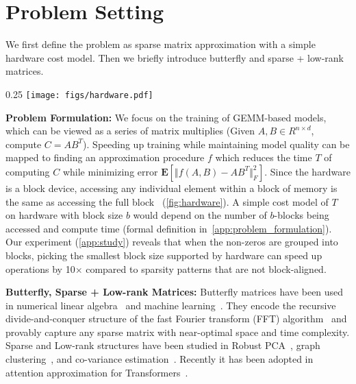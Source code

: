 \section{Problem Setting}
\label{sec:problem_formulation}
We first define the problem as sparse matrix approximation with a simple hardware cost model. Then we briefly introduce butterfly and sparse + low-rank matrices. 

\begin{wrapfigure}{}{0.25\textwidth}
  \captionsetup{font=small}
  \vspace{-2em}
  \centering
  \texttt{[image: figs/hardware.pdf]}
  \vspace{-1em}
  \caption{Visualization of memory access for a hardware with block size 4: accessing the one (red) location means accessing the full $4\times4$ block (blue).}
  \label{fig:hardware}
  \vspace{-1em}
\end{wrapfigure}
\textbf{Problem Formulation:} We focus on the training of GEMM-based models, which can be viewed as a series of matrix multiplies (Given $A, B \in R^{n \times d}$, compute $C = AB^T$). Speeding up training while maintaining model quality can be mapped to finding an approximation procedure $f$ which reduces the time $T$ of computing $C$ while minimizing error $\mathbf{E}[\Vert f(A, B)-AB^T\Vert^2_F]$. Since the hardware is a block device, accessing any individual element within a block of memory is the same as accessing the full block~\citep{cook2012cuda} (\cref{fig:hardware}). A simple cost model of $T$ on hardware with block size $b$ would depend on the number of $b$-blocks being accessed and compute time
(formal definition in~\cref{app:problem_formulation}).
Our experiment (\cref{app:study}) reveals that when the non-zeros are grouped into blocks, picking the smallest block size supported by hardware can speed up operations by 10$\times$ compared to sparsity patterns that are not block-aligned.


\textbf{Butterfly, Sparse + Low-rank Matrices:} Butterfly matrices have been used in numerical linear algebra~\citep{parker1995random, li2015butterfly} and machine learning~\citep{mathieu2014fast, jing2017tunable, munkhoeva2018quadrature, dao2019learning, choromanski2019unifying}. They encode the recursive divide-and-conquer structure of the fast Fourier transform (FFT) algorithm~\citep{cooley1965algorithm} and provably capture any sparse matrix with near-optimal space and time complexity. Sparse and Low-rank structures have been studied in Robust PCA~\citep{candes2011robust}, graph clustering~\citep{jalali2011clustering}, and co-variance estimation~\citep{luo2011high}. Recently it has been adopted in attention approximation for Transformers~\citep{scatterbrain}. 